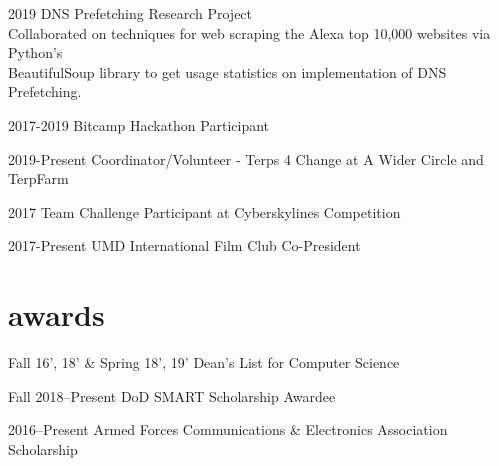 \documentclass[print]{friggeri-cv} %
\begin{document}
\begin{entrylist}


\entrynobold
{2019}
{DNS Prefetching Research Project}
{\\ \hspace*{.25cm} Collaborated on techniques for web scraping the Alexa top 10,000 websites via Python's \\ \hspace*{.25cm} BeautifulSoup library to get usage statistics on implementation of DNS Prefetching.}
{}

\entrynobold
{2017-2019}
{Bitcamp Hackathon Participant}
{}
{}


\entrynobold
{2019-Present}
{Coordinator/Volunteer - Terps 4 Change at A Wider Circle and TerpFarm}
{}
{}

\entrynobold
{2017}
{Team Challenge Participant at Cyberskylines Competition}
{}
{}

\entrynobold
{2017-Present}
{UMD International Film Club Co-President}
{}
{}


\end{entrylist}


\section{awards}

\begin{entrylist}

\entrynobold
{Fall 16', 18' \& Spring 18', 19'}
{Dean's List for Computer Science}
{}
{}

\entrynobold
{Fall 2018--Present}
{DoD SMART Scholarship Awardee}
{}
{}

\entrynobold
{2016--Present}
{Armed Forces Communications \& Electronics Association Scholarship}
{}
{}


\end{entrylist}
\clearpage
\end{document}
